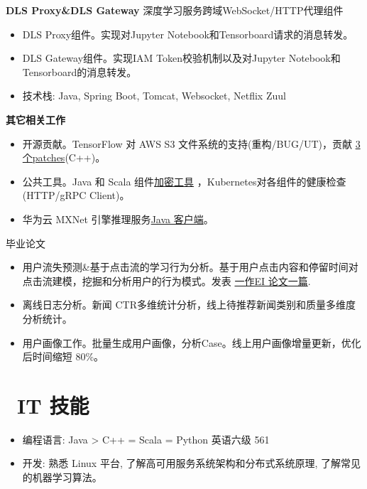 \documentclass{resume}
\begin{document}
\begin{onehalfspacing}
\textbf{DLS Proxy\&DLS Gateway}  深度学习服务跨域WebSocket/HTTP代理组件
\begin{itemize}%
  \item DLS Proxy组件。实现对Jupyter Notebook和Tensorboard请求的消息转发。
  \item DLS Gateway组件。实现IAM Token校验机制以及对Jupyter Notebook和Tensorboard的消息转发。
  \item 技术栈: Java, Spring Boot, Tomcat, Websocket, Netflix Zuul
\end{itemize}
\end{onehalfspacing}

\begin{onehalfspacing}
\textbf{其它相关工作}  
\begin{itemize}%
  \item 开源贡献。TensorFlow 对 AWS S3 文件系统的支持(重构/BUG/UT)，贡献 \href{https://github.com/tensorflow/tensorflow/pull/11089#issuecomment-320258536}{3 个patches}(C++)。
  \item 公共工具。Java 和 Scala 组件\href{https://github.com/neuzxy/AESCryptTools}{加密工具} ，Kubernetes对各组件的健康检查(HTTP/gRPC Client)。 
  \item 华为云 MXNet 引擎推理服务\href{https://github.com/huawei-clouds/dls-mxserving-client/tree/master/java}{Java 客户端}。
\end{itemize}
\end{onehalfspacing}

 {毕业论文}
\begin{itemize}[parsep=0.5ex]
  \item 用户流失预测\&基于点击流的学习行为分析。基于用户点击内容和停留时间对点击流建模，挖掘和分析用户的行为模式。发表 \href{https://link.springer.com/chapter/10.1007/978-981-10-7398-4_41}{一作EI 论文一篇}. 
\end{itemize}

\begin{itemize}[parsep=0.5ex]
  \item 离线日志分析。新闻 CTR多维统计分析，线上待推荐新闻类别和质量多维度分析统计。
  \item 用户画像工作。批量生成用户画像，分析Case。线上用户画像增量更新，优化后时间缩短 80\%。
\end{itemize}

\section{\faCogs\ IT 技能}
\begin{itemize}[parsep=0.5ex]
  \item 编程语言: Java > C++ = Scala = Python 英语六级 561
  \item 开发: 熟悉 Linux 平台, 了解高可用服务系统架构和分布式系统原理, 了解常见的机器学习算法。
\end{itemize}
\end{document}
